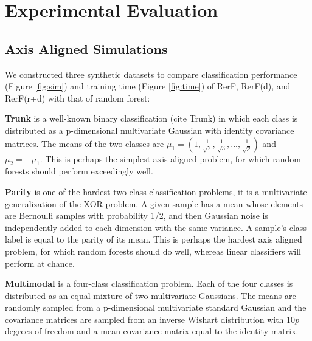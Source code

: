\documentclass{article} %
\begin{document}

\section{Experimental Evaluation}

\subsection{Axis Aligned Simulations}

We constructed three synthetic datasets to compare classification performance (Figure \ref{fig:sim}) and training time (Figure \ref{fig:time}) of RerF, RerF(d), and RerF(r+d) with that of random forest:

\textbf{Trunk} is a well-known binary classification (cite Trunk) in which each class is distributed as a p-dimensional multivariate Gaussian with identity covariance matrices. The means of the two classes are $\mu_1 = (1,\frac{1}{\sqrt{2}},\frac{1}{\sqrt{3}},...,\frac{1}{\sqrt{p}})$ and $\mu_2 = -\mu_1$. This is perhaps the simplest axis aligned problem, for which random forests should perform exceedingly well.  

\textbf{Parity} is one of the hardest two-class classification problems, it is a multivariate generalization of the XOR problem.  A given sample has a mean whose elements are Bernoulli samples with probability 1/2, and then Gaussian noise is independently added to each dimension with the same variance.  A sample's class label is equal to the parity of its mean.  This is perhaps the hardest axis aligned problem, for which random forests should do well, whereas linear classifiers will perform at chance.

\textbf{Multimodal} is a four-class classification problem. Each of the four classes is distributed as an equal mixture of two multivariate Gaussians. The means are randomly sampled from a p-dimensional multivariate standard Gaussian and the covariance matrices are sampled from an inverse Wishart distribution with $10p$ degrees of freedom and  a mean covariance matrix equal to the identity matrix.
\end{document}
